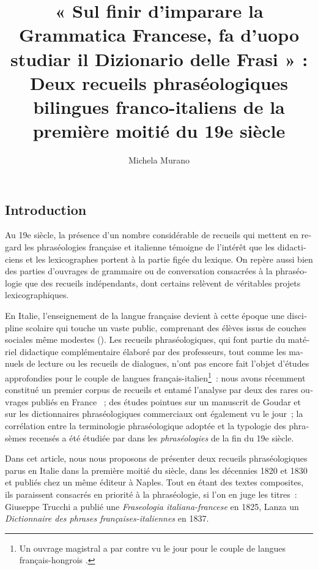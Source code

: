 \documentclass[output=paper,booklanguage=french]{langscibook}
\author{Michela Murano\affiliation{Università Cattolica del Sacro Cuore, Milan, Italy}}
\title[Deux recueils phraséologiques bilingues franco-italiens du 19e siècle]
      {« Sul finir d’imparare la Grammatica Francese, fa d’uopo studiar il Dizionario delle Frasi » : Deux recueils phraséologiques bilingues franco-italiens de la première moitié du 19e siècle}
\begin{document}
 
\begin{otherlanguage}{french}
\maketitle

\section{Introduction}

Au 19e siècle, la présence d’un nombre considérable de recueils qui mettent en regard les phraséologies française et italienne témoigne de l’intérêt que les didacticiens et les lexicographes portent à la partie figée du lexique. On repère aussi bien des parties d’ouvrages de grammaire ou de conversation consacrées à la phraséologie que des recueils indépendants, dont certains relèvent de véritables projets lexicographiques.

En Italie, l’enseignement de la langue française devient à cette époque une discipline scolaire qui touche un vaste public, comprenant des élèves issus de couches sociales même modestes (\citealt{Pellandra1997, Minerva1998}). Les recueils phraséologiques, qui font partie du matériel didactique complémentaire élaboré par des professeurs, tout comme les manuels de lecture ou les recueils de dialogues, n’ont pas encore fait l’objet d’études approfondies pour le couple de langues français-italien\footnote{Un ouvrage magistral a par contre vu le jour pour le couple de langues français-hongrois \citep{Bardosi2017}.}~: nous avons récemment constitué un premier corpus de recueils \citep{Murano2017} et entamé l’analyse par deux des rares ouvrages publiés en France \citep{Murano2020}~; des études pointues sur un manuscrit de Goudar \citep{Lillo2014} et sur les dictionnaires phraséologiques commerciaux \citep{Sclafani2019} ont également vu le jour~; la corrélation entre la terminologie phraséologique adoptée et la typologie des phrasèmes recensés a été étudiée par \citet{Autelli2022} dans les \emph{phraséologies} de la fin du 19e siècle.

Dans cet article, nous nous proposons de présenter deux recueils phraséologiques parus en Italie dans la première moitié du siècle, dans les décennies 1820 et 1830 et publiés chez un même éditeur à Naples. Tout en étant des textes composites, ils paraissent consacrés en priorité à la phraséologie, si l’on en juge les titres~: Giuseppe Trucchi a publié une \emph{Fraseologia italiana-francese} en 1825, Lanza un \emph{Dictionnaire des phrases françaises-italiennes} en 1837. 


\end{otherlanguage}
\end{document}
